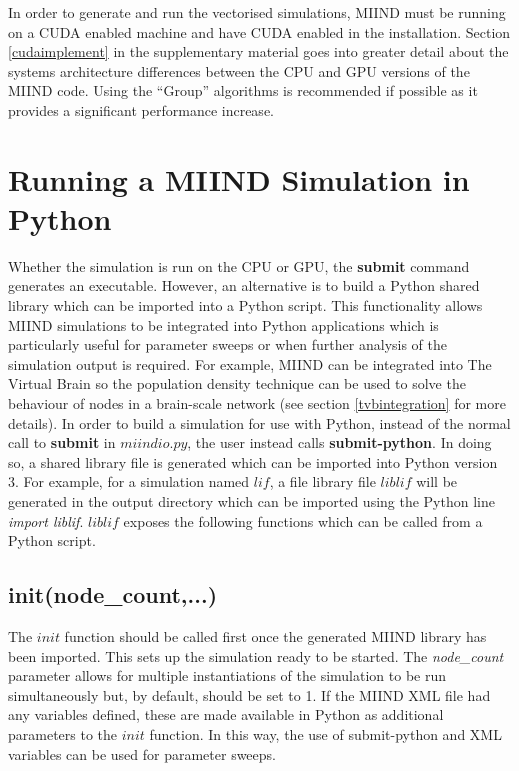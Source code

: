 \documentclass[utf8]{frontiersSCNS} %
\begin{document}
In order to generate and run the vectorised simulations, MIIND must be running on a CUDA enabled machine and have CUDA enabled in the installation. Section \ref{cudaimplement} in the supplementary material goes into greater detail about the systems architecture differences between the CPU and GPU versions of the MIIND code. Using the ``Group'' algorithms is recommended if possible as it provides a significant performance increase.\\

\section{Running a MIIND Simulation in Python}
Whether the simulation is run on the CPU or GPU, the \textbf{submit} command generates an executable. However, an alternative is to build a Python shared library which can be imported into a Python script. This functionality allows MIIND simulations to be integrated into Python applications which is particularly useful for parameter sweeps or when further analysis of the simulation output is required. For example, MIIND can be integrated into The Virtual Brain \citep{sanz2013virtual} so the population density technique can be used to solve the behaviour of nodes in a brain-scale network (see section \ref{tvbintegration} for more details). In order to build a simulation for use with Python, instead of the normal call to \textbf{submit} in $miindio.py$, the user instead calls \textbf{submit-python}. In doing so, a shared library file is generated which can be imported into Python version 3. For example, for a simulation named $lif$, a file library file $liblif$ will be generated in the output directory which can be imported using the Python line \textit{import liblif}. $liblif$ exposes the following functions which can be called from a Python script.

\subsection{init(node\_count,...)}
The $init$ function should be called first once the generated MIIND library has been imported. This sets up the simulation ready to be started. The \textit{node\_count} parameter allows for multiple instantiations of the simulation to be run simultaneously but, by default, should be set to 1. If the MIIND XML file had any variables defined, these are made available in Python as additional parameters to the $init$ function. In this way, the use of submit-python and XML variables can be used for parameter sweeps.
\end{document}
